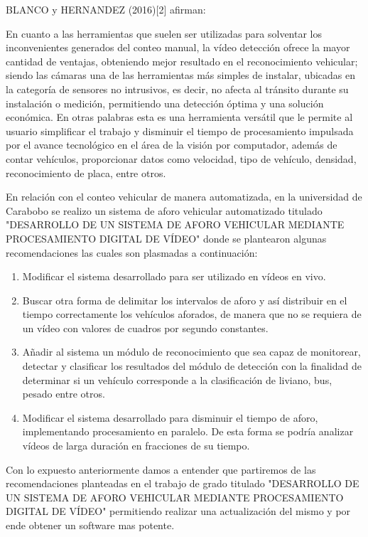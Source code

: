 {\noindent BLANCO y HERNANDEZ (2016)[2] afirman:}

{\setlength{\parindent}{1.5em}En cuanto a las herramientas que suelen ser utilizadas para solventar los inconvenientes generados del conteo manual, la vídeo detección ofrece la mayor cantidad de ventajas, obteniendo mejor resultado en el reconocimiento vehicular; siendo las cámaras una de las herramientas más simples de instalar, ubicadas en la categoría de sensores no intrusivos, es decir, no afecta al tránsito durante su instalación o medición, permitiendo una detección óptima y una solución económica. En otras palabras esta es una herramienta versátil que le permite al usuario simplificar el trabajo y disminuir el tiempo de procesamiento impulsada por el avance tecnológico en el área de la visión por computador, además de contar vehículos, proporcionar datos como velocidad, tipo de vehículo, densidad, reconocimiento de placa, entre otros.}

En relación con el conteo vehicular de manera automatizada, en la universidad de Carabobo se realizo un sistema de aforo vehicular automatizado titulado "DESARROLLO DE UN SISTEMA DE AFORO VEHICULAR MEDIANTE PROCESAMIENTO DIGITAL DE VÍDEO" donde se plantearon algunas recomendaciones las cuales son plasmadas a continuación:

\begin{enumerate}
	\item Modificar el sistema desarrollado para ser utilizado en vídeos en vivo.
	\item Buscar otra forma de delimitar los intervalos de aforo y así distribuir en el tiempo correctamente los vehículos aforados, de manera que no se requiera de un vídeo con valores de cuadros por segundo constantes.
	\item Añadir al sistema un módulo de reconocimiento que sea capaz de monitorear, detectar y clasificar los resultados del módulo de detección con la finalidad de determinar si un vehículo corresponde a la clasificación de liviano, bus, pesado entre otros.
	\item Modificar el sistema desarrollado para disminuir el tiempo de aforo, implementando procesamiento en paralelo. De esta forma se podría analizar vídeos de larga duración en fracciones de su tiempo.
	
\end{enumerate}

Con lo expuesto anteriormente damos a entender que partiremos de las recomendaciones planteadas en el trabajo de grado titulado "DESARROLLO DE UN SISTEMA DE AFORO VEHICULAR MEDIANTE PROCESAMIENTO DIGITAL DE VÍDEO" permitiendo realizar una actualización del mismo y por ende obtener un software mas potente. 
 

